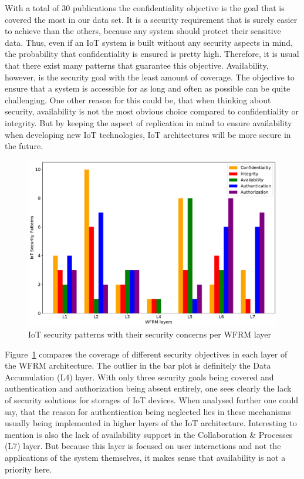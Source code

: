 With a total of 30 publications the confidentiality objective is the goal that is covered the most in our data set. It is a security requirement that is surely easier to achieve than the others, because any system should protect their sensitive data. Thus, even if an IoT system is built without any security aspects in mind, the probability that confidentiality is ensured is pretty high. Therefore, it is usual that there exist many patterns that guarantee this objective. Availability, however, is the security goal with the least amount of coverage. The objective to ensure that a system is accessible for as long and often as possible can be quite challenging. One other reason for this could be, that when thinking about security, availability is not the most obvious choice compared to confidentiality or integrity. But by keeping the aspect of replication in mind to ensure availability when developing new IoT technologies, IoT architectures will be more secure in the future. 

\begin{figure}[ht]
	\centering
	\includegraphics[width=0.9\linewidth]{img/RQ2}
	\caption{IoT security patterns with their security concerns per WFRM layer}
	\label{fig:rq2}
\end{figure}

Figure~\ref{fig:rq2} compares the coverage of different security objectives in each layer of the WFRM architecture. The outlier in the bar plot is definitely the Data Accumulation (L4) layer. With only three security goals being covered and authentication and authorization being absent entirely, one sees clearly the lack of security solutions for storages of IoT devices. When analysed further one could say, that the reason for authentication being neglected lies in these mechanisms usually being implemented in higher layers of the IoT architecture. Interesting to mention is also the lack of availability support in the Collaboration \& Processes (L7) layer. But because this layer is focused on user interactions and not the applications of the system themselves, it makes sense that availability is not a priority here. 


